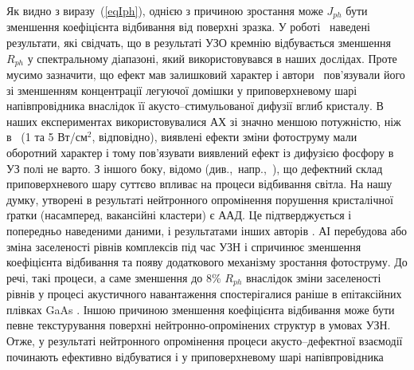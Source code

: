 Як видно з виразу~(\ref{eqIph}), однією з причиною зростання може $J_{ph}$ бути зменшення коефіцієнта відбивання від поверхні зразка.
У роботі~\cite{Zaver} наведені результати, які свідчать, що в результаті УЗО кремнію відбувається
зменшення $R_{ph}$ у спектральному
діапазоні, який використовувався в наших дослідах.
Проте мусимо зазначити, що ефект мав залишковий характер і
автори~\cite{Zaver} пов’язували його зі зменшенням концентрації
легуючої домішки у приповерхневому шарі напівпровідника внаслідок
її акусто--стимульованої дифузії вглиб кристалу.
В наших експериментах використовувалися АХ зі значно меншою потужністю, ніж
в~\cite{Zaver} (1 та 5 Вт/см$^2$, відповідно),  виявлені ефекти зміни фотоструму мали оборотний характер
і тому пов'язувати виявлений ефект із дифузією фосфору в УЗ полі не варто.
З іншого боку, відомо (див.,~напр.,~\cite{Kizel}), що дефектний склад
приповерхневого шару суттєво впливає на процеси відбивання світла.
На нашу думку, утворені в результаті нейтронного опромінення порушення кристалічної ґратки
(насамперед, вакансійні кластери) є ААД.
Це підтверджується і попередньо наведеними даними, і результатами інших авторів \cite{YOlikh2006TPLr}.
АІ перебудова або зміна заселеності рівнів комплексів під час УЗН і спричинює зменшення коефіцієнта відбивання
та появу додаткового механізму зростання фотоструму.
До речі, такі процеси, а саме зменшення до 8\% $R_{ph}$ внаслідок зміни заселеності рівнів у
процесі акустичного навантаження спостерігалися раніше в
епітаксійних плівках GaAs \cite{Korotch}.
Іншою причиною зменшення
коефіцієнта відбивання може бути певне текстурування поверхні нейтронно-опромінених
структур в умовах УЗН.
Отже, у результаті нейтронного опромінення
процеси акусто--дефектної взаємодії
починають ефективно відбуватися і у
приповерхневому шарі напівпровідника




